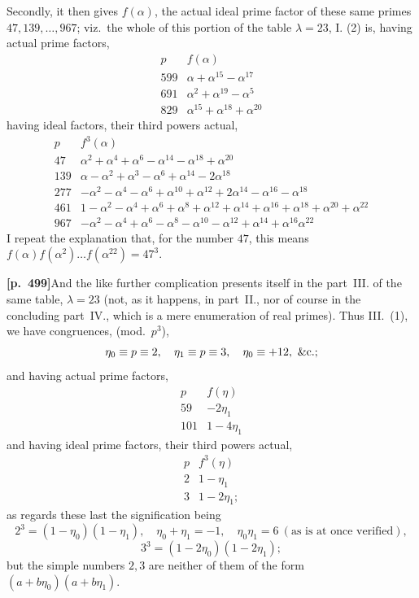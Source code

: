 \documentclass[11pt,a4paper]{article}
\begin{document}
Secondly, it then gives $f(\alpha)$, the actual ideal prime factor of these same primes $47, 139, \ldots, 967$; viz.\ the whole of this portion of the table $\lambda = 23$, I. (2) is, having actual prime factors,
\[
\begin{array}{c|l}
p & f(\alpha) \\
\hline
599 & \alpha + \alpha^{15} - \alpha^{17} \\
691 & \alpha^{2} + \alpha^{19} - \alpha^{5} \\
829 & \alpha^{15} + \alpha^{18} + \alpha^{20}
\end{array}
\]
having ideal factors, their third powers actual,
\[
\begin{array}{c|l}
p & f^{3}(\alpha) \\
\hline
47 & \alpha^{2} + \alpha^{4} + \alpha^{6} - \alpha^{14} - \alpha^{18} + \alpha^{20} \\
139 & \alpha - \alpha^{2} + \alpha^{3} - \alpha^{6} + \alpha^{14} - 2\alpha^{18} \\
277 & -\alpha^{2} - \alpha^{4} - \alpha^{6} + \alpha^{10} + \alpha^{12} + 2\alpha^{14} - \alpha^{16} - \alpha^{18} \\
461 & 1 - \alpha^{2} - \alpha^{4} + \alpha^{6} + \alpha^{8} + \alpha^{12} + \alpha^{14} + \alpha^{16} + \alpha^{18} + \alpha^{20} + \alpha^{22} \\
967 & -\alpha^{2} - \alpha^{4} + \alpha^{6} - \alpha^{8} - \alpha^{10} - \alpha^{12} + \alpha^{14} + \alpha^{16} \alpha^{22}
\end{array}
\]
I repeat the explanation that, for the number $47$, this means $f(\alpha)f(\alpha^{2}) \ldots f(\alpha^{22}) = 47^{3}$.


\noindent\textbf{[p.~499]}\quad And the like further complication presents itself in the part~III. of the same table, $\lambda = 23$ (not, as it happens, in part~II., nor of course in the concluding part~IV., which is a mere enumeration of real primes). Thus III.~(1), we have congruences, (mod.~$p^{3}$),
\[
\eta_{0} \equiv p \equiv 2,\quad \eta_{1} \equiv p \equiv 3,\quad \eta_{0} \equiv +12,\ \&{\rm c.};
\]
and having actual prime factors,
\[
\begin{array}{c|l}
p & f(\eta) \\
\hline
59 & -2\eta_{1} \\
101 & 1 - 4\eta_{1}
\end{array}
\]
and having ideal prime factors, their third powers actual,
\[
\begin{array}{c|l}
p & f^{3}(\eta) \\
\hline
2 & 1 - \eta_{1} \\
3 & 1 - 2\eta_{1};
\end{array}
\]
as regards these last the signification being
\[
2^{3} = (1 - \eta_{0})(1 - \eta_{1}),\quad \eta_{0} + \eta_{1} = -1,\quad \eta_{0}\eta_{1} = 6\ (\text{as is at once verified}),
\]
\[
3^{3} = (1 - 2\eta_{0})(1 - 2\eta_{1});
\]
but the simple numbers $2, 3$ are neither of them of the form $(a + b\eta_{0})(a + b\eta_{1})$.
\end{document}
